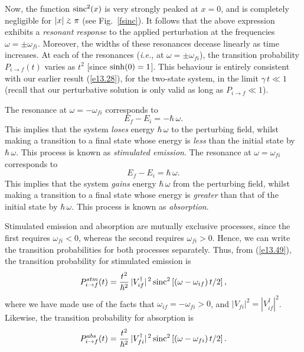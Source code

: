 Now, the function ${\rm sinc}^2(x)$ is very strongly peaked at $x=0$,
and is completely negligible for $|x|\stackrel {_{\normalsize>}}{_{\normalsize \sim}}\pi$ (see Fig.~\ref{fsinc}). It follows that the above expression exhibits a
{\em resonant response}\/ to the applied perturbation at the frequencies $\omega=\pm\omega_{fi}$. Moreover,
the widths of these resonances decease linearly as time increases. At each
of the resonances ({\em i.e.}, at $\omega=\pm\omega_{fi}$), the transition
probability $P_{i\rightarrow f}(t)$ varies as $t^2$ [since ${\rm sinh} (0)=1$]. This behaviour
is entirely consistent with our earlier result (\ref{e13.28}), for the two-state
system, in the limit $\gamma\,t\ll 1$ (recall that our perturbative
solution is only valid as long as $P_{i\rightarrow f}\ll 1$).

The resonance at $\omega=-\omega_{fi}$  corresponds to
\begin{equation}
E_f - E_i = -\hbar\,\omega.
\end{equation}
This implies that the system {\em loses}\/ energy $\hbar\,\omega$ to the
perturbing field, whilst making a transition to a final state whose
energy is {\em less}\/ than the initial state by $\hbar\,\omega$. This process is
known as {\em stimulated emission}. The resonance at $\omega=\omega_{fi}$ corresponds to
\begin{equation}
E_f - E_i = \hbar\,\omega.
\end{equation}
This implies that the system {\em gains}\/  energy $\hbar\,\omega$ from the
perturbing field, whilst making a transition to a final state whose
energy is {\em greater}\/ than that of the initial state by $\hbar\,\omega$. This
process is known as {\em absorption}. 

Stimulated emission and absorption are mutually exclusive processes, since the
first requires $\omega_{fi}<0$, whereas the second requires $\omega_{fi}>0$. Hence, we can write the transition probabilities for
both processes separately. Thus, from (\ref{e13.49}), the
transition probability for stimulated emission is
\begin{equation}
P_{i\rightarrow f}^{stm}(t) = \frac{t^2}{\hbar^2}\,
|V_{if}^\dag|^{\,2}\,{\rm sinc}^2\left[(\omega-\omega_{if})\,t/2\right],
\end{equation}
where we have made use of the facts that $\omega_{if}=-\omega_{fi}>0$,
and $|V_{fi}|^2=|V_{if}^\dag|^2$. Likewise, the transition probability
for absorption is
\begin{equation}\label{e13.63}
P_{i\rightarrow f}^{abs}(t) = \frac{t^2}{\hbar^2}\,
|V_{fi}^\dag|^{\,2}\,{\rm sinc}^2\left[(\omega-\omega_{fi})\,t/2\right].
\end{equation}

